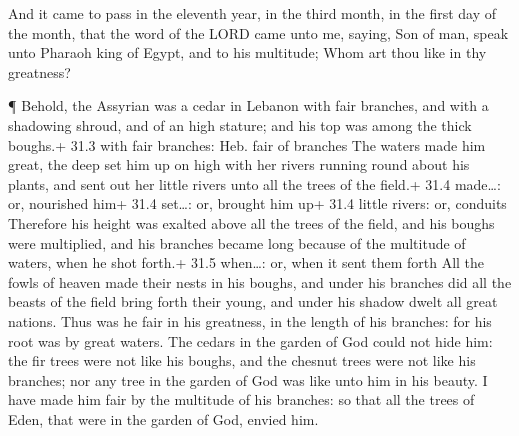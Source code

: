  And it came to pass in the eleventh year, in the third
month, in the first day of the month, that the word of the LORD came
unto me, saying,  Son of man, speak unto Pharaoh king of
Egypt, and to his multitude; Whom art thou like in thy greatness?

 ¶ Behold, the Assyrian was a cedar in Lebanon with fair
branches, and with a shadowing shroud, and of an high stature; and his
top was among the thick boughs.+ 31.3 with fair branches: Heb. fair of
branches  The waters made him great, the deep set him up on
high with her rivers running round about his plants, and sent out her
little rivers unto all the trees of the field.+ 31.4 made\ldots: or,
nourished him+ 31.4 set\ldots: or, brought him up+ 31.4 little rivers:
or, conduits  Therefore his height was exalted above all the
trees of the field, and his boughs were multiplied, and his branches
became long because of the multitude of waters, when he shot forth.+
31.5 when\ldots: or, when it sent them forth  All the fowls
of heaven made their nests in his boughs, and under his branches did all
the beasts of the field bring forth their young, and under his shadow
dwelt all great nations.  Thus was he fair in his greatness,
in the length of his branches: for his root was by great waters.
 The cedars in the garden of God could not hide him: the fir
trees were not like his boughs, and the chesnut trees were not like his
branches; nor any tree in the garden of God was like unto him in his
beauty.  I have made him fair by the multitude of his
branches: so that all the trees of Eden, that were in the garden of God,
envied him.

